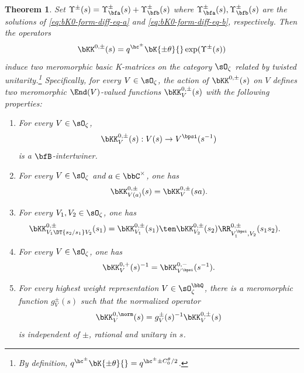 \documentclass[reqno]{amsart}
\numberwithin{equation}{section}
\newtheorem*{theorem}{Theorem}
\begin{document}
\begin{theorem}\label{thm:basic-K}
Set $\Upsilon^\pm(s)=\Upsilon^\pm_{\bfa}(s)+\Upsilon_{\bfb}^{\pm}(s)$ where $\Upsilon_{\bfa}^\pm(s), \Upsilon_{\bfb}^\pm(s)$ are the solutions of \eqref{eq:bK0-form-diff-eq-a} and \eqref{eq:bK0-form-diff-eq-b}, respectively. 
Then the operators
\begin{equation}\label{eq:bK0-form}
	\bKK^{0,\pm}(s)
	=
	q^{\hc^\pm}\bK{\pm\theta}{}\exp(\Upsilon^{\pm}(s))
\end{equation}
induce two meromorphic basic K-matrices on the category $\sO_\zeta$
related by twisted unitarity.\footnote{
By definition, $q^{\hc^\pm}\bK{\pm\theta}{}=q^{\hc^\pm\pm C_0^\theta/2}$.}
Specifically, for every $V\in\sO_\zeta$, the action of $\bKK^{0,\pm}(s)$ on $V$
defines two meromorphic $\End(V)$-valued functions
$\bKK_{V}^{0,\pm}(s)$ with the following properties:
\begin{enumerate}[font=\upshape]\itemsep0.25cm
	\item\label{bK0:int} For every $V\in\sO_\zeta$,
	\begin{equation}\label{eq:bK0-intertwining}
		\bKK^{0,\pm}_{V}(s) : V(s) \to
		V^{\bpsi}(s^{-1})
	\end{equation}
	is a $\bfB$-intertwiner.
	\item\label{bK0:shift} For every $V\in\sO_\zeta$
	and $a\in\bbC^\times$, one has
	\begin{equation}\label{eq:bK0-shift}
		\bKK^{0,\pm}_{V(a)}(s) = \bKK^{0,\pm}_{V}(sa).
	\end{equation}
	\item\label{bK0:coproduct} For every $V_1,V_2\in\sO_\zeta$, one has
	\begin{align}
		\label{eq:bK0-coproduct}
		\bKK^{0,\pm}_{V_1\DT{s_2/s_1}V_2}(s_1) &=
		\bKK^{0,\pm}_{V_1}(s_1)\ten\bKK^{0,\pm}_{V_2}(s_2)
		\RR^{0,\pm}_{V_1^\bpsi,V_2}(s_1s_2).
	\end{align}
	\item\label{bK0:unitary} For every $V\in\sO_\zeta$, one has
	\begin{equation}\label{eq:bK0-unitary}
		\bKK^{0,+}_{V}(s)^{-1} =
		\bKK^{0,-}_{V^{\bpsi}}(s^{-1}).
	\end{equation}
	\item\label{bK0:rat} For every highest weight representation $V\in\sO^\bbQ_{\zeta}$, there is a meromorphic function $g^{\pm}_{V}(s)$ such that the normalized operator
	\begin{equation}\label{eq:bK0-norm}
		\bKK^{0,\norm}_{V}(s)=g^{\pm}_{V}(s)^{-1}\bKK^{0,\pm}_{V}(s)
	\end{equation}
	is independent of $\pm$, rational and unitary in $s$.
\end{enumerate}
\end{theorem}
\end{document}
